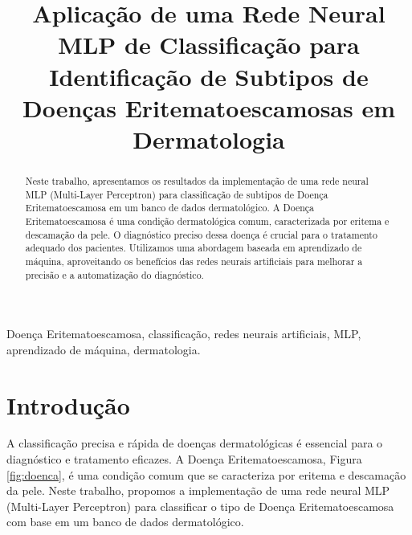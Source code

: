 \documentclass[conference]{IEEEtran}
\begin{document}
\title{Aplicação de uma Rede Neural MLP de Classificação para Identificação de Subtipos de Doenças Eritematoescamosas em Dermatologia\\
}

\author{
\and
{}
}

\maketitle

\begin{abstract}
Neste trabalho, apresentamos os resultados da implementação de uma rede neural MLP (Multi-Layer Perceptron) para classificação de subtipos de Doença Eritematoescamosa em um banco de dados dermatológico. A Doença Eritematoescamosa é uma condição dermatológica comum, caracterizada por eritema e descamação da pele. O diagnóstico preciso dessa doença é crucial para o tratamento adequado dos pacientes. Utilizamos uma abordagem baseada em aprendizado de máquina, aproveitando os benefícios das redes neurais artificiais para melhorar a precisão e a automatização do diagnóstico.
\end{abstract}

\begin{IEEEkeywords}
Doença Eritematoescamosa, classificação, redes neurais artificiais, MLP, aprendizado de máquina, dermatologia.
\end{IEEEkeywords}

\section{Introdução}
A classificação precisa e rápida de doenças dermatológicas é essencial para o diagnóstico e tratamento eficazes. A Doença Eritematoescamosa, Figura \ref{fig:doenca}, é uma condição comum que se caracteriza por eritema e descamação da pele. Neste trabalho, propomos a implementação de uma rede neural MLP (Multi-Layer Perceptron) para classificar o tipo de Doença Eritematoescamosa com base em um banco de dados dermatológico.
\end{document}
